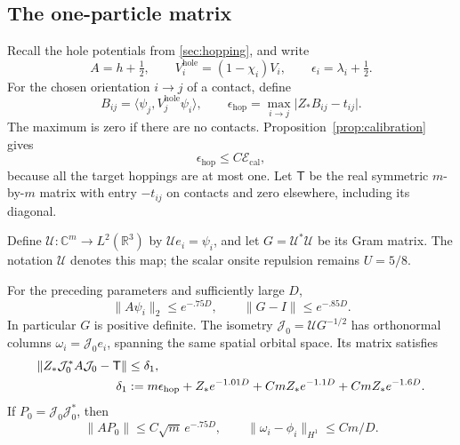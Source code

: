 \subsection{The one-particle matrix}

Recall the hole potentials from \cref{sec:hopping}, and write
\[
 A=h+\tfrac12,\qquad
 V_i^{\mathrm{hole}}=(1-\chi_i)V_i,\qquad
 \epsilon_i=\lambda_i+\tfrac12.
\]
For the chosen orientation \(i\to j\) of a contact, define
\[
 B_{ij}=\langle\psi_j,V_j^{\mathrm{hole}}\psi_i\rangle,\qquad
 \epsilon_{\mathrm{hop}}
 =\max_{i\to j}\bigl|Z_*B_{ij}-t_{ij}\bigr|.
\]
The maximum is zero if there are no contacts.
Proposition~\ref{prop:calibration} gives
\begin{equation}
 \epsilon_{\mathrm{hop}}\le C\mathcal E_{\mathrm{cal}},
 \label{eq:continuum-calibration-interface}
\end{equation}
because all the target hoppings are at most one.
Let \(\mathsf T\) be the real symmetric \(m\)-by-\(m\) matrix with
entry \(-t_{ij}\) on contacts and zero elsewhere, including its
diagonal.

Define \(\mathcal U:\mathbb C^m\to L^2(\mathbb R^3)\) by
\(\mathcal U e_i=\psi_i\), and let \(G=\mathcal U^*\mathcal U\)
be its Gram matrix.  The notation \(\mathcal U\) denotes this map;
the scalar onsite repulsion remains \(U=5/8\).

\begin{lemma}
\label{lem:one-body-matrix}
For the preceding parameters and sufficiently large \(D\),
\begin{equation}
 \|A\psi_i\|_2\le e^{-.75D},\qquad
 \|G-I\|\le e^{-.85D}.
 \label{eq:continuum-residual-gram}
\end{equation}
In particular \(G\) is positive definite.
The isometry
\(\mathcal J_0=\mathcal U G^{-1/2}\) has orthonormal columns
\(\omega_i=\mathcal J_0e_i\), spanning the same spatial orbital
space.  Its matrix satisfies
\begin{align}
 \|Z_*\mathcal J_0^*A\mathcal J_0-\mathsf T\|
 &\le \delta_1, \label{eq:continuum-one-body-error}\\
 \delta_1
 &:=m\epsilon_{\mathrm{hop}}+Z_*e^{-1.01D}
       +CmZ_*e^{-1.1D}+CmZ_*e^{-1.6D}. \notag
\end{align}
If \(P_0=\mathcal J_0\mathcal J_0^*\), then
\begin{equation}
 \|AP_0\|\le C\sqrt m\,e^{-.75D},
 \qquad
 \|\omega_i-\phi_i\|_{H^1}\le Cm/D.
 \label{eq:continuum-projected-residual}
\end{equation}
\end{lemma}

